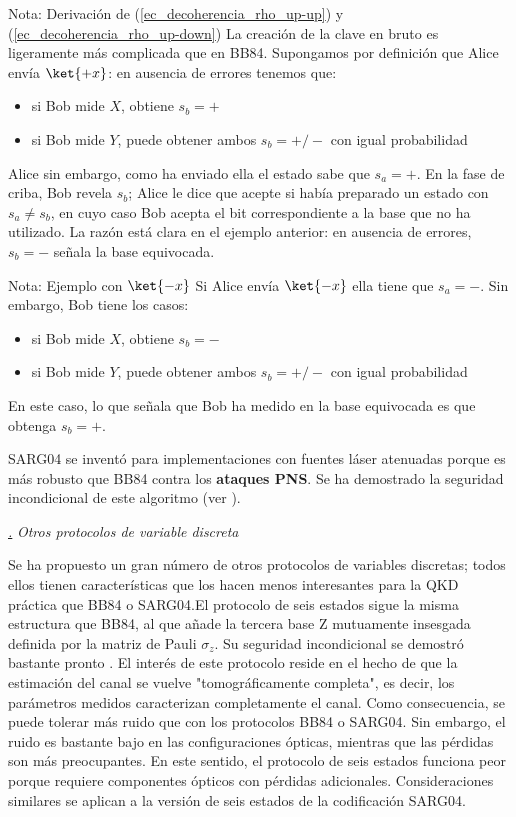 \documentclass[a4paper,11pt]{book} %
\numberwithin{equation}{chapter}
\def\subsubiContadorIt{\par\addtocounter{subsubsection}{1}\underline{\it\thesubsubsection.}\hskip0.5cm \setcounter{subsubsubsectionIt}{0}}
\newcommand{\SubsubiIt}[1]{
		\subsubiContadorIt \textit{#1}
	}
\newcounter{subsubsubsectionIt}[subsubsection]
\begin{document}
\begin{mybox_blue}{Nota: Derivación de (\ref{ec_decoherencia_rho_up-up}) y  (\ref{ec_decoherencia_rho_up-down})}
La creación de la clave en bruto es ligeramente más complicada que en BB84. Supongamos por definición que Alice envía $\ket{+x}$: en ausencia de errores tenemos que:
\begin{itemize}
	\item si Bob mide $X$, obtiene $s_b = +$
	\item si Bob mide $Y$, puede obtener ambos $s_b= +/-$ con igual probabilidad
\end{itemize}  
Alice sin embargo, como ha enviado ella el estado sabe que $s_a = +$. En la fase de criba, Bob revela $s_b$; Alice le dice que acepte si había preparado un estado con $s_a \neq s_b$, en cuyo caso Bob acepta el bit correspondiente a la base que no ha utilizado. La razón está clara en el ejemplo anterior: en ausencia de errores, $s_b= -$ señala la base equivocada.

	\begin{mybox_blue}{Nota: Ejemplo con $\ket{-x}$}
	Si Alice envía $\ket{-x}$ ella tiene que $s_a = -$. Sin embargo, Bob tiene los casos:
	\begin{itemize}
		\item si Bob mide $X$, obtiene $s_b = -$
		\item si Bob mide $Y$, puede obtener ambos $s_b= +/-$ con igual probabilidad
	\end{itemize} 
	En este caso, lo que señala que Bob ha medido en la base equivocada es que obtenga $s_b = +$.
	\end{mybox_blue}

SARG04 se inventó para implementaciones con fuentes láser atenuadas porque es más robusto que BB84 contra los \textbf{ataques PNS}. Se ha demostrado la seguridad incondicional de este algoritmo (ver \cite{QKD_resumen}).


			\SubsubiIt{Otros protocolos de variable discreta}

Se ha propuesto un gran número de otros protocolos de variables discretas; todos ellos tienen características que los hacen menos interesantes para la QKD práctica que BB84 o SARG04.El protocolo de seis estados \cite{QKD_Six_state_2,QKD_Six_state_3} sigue la misma estructura que BB84, al que añade la tercera base Z mutuamente insesgada definida por la matriz de Pauli $\sigma_z$. Su seguridad incondicional se demostró bastante pronto \cite{QKD_Six_state_lo2001proof}. El interés de este protocolo reside en el hecho de que la estimación del canal se vuelve "tomográficamente completa", es decir, los parámetros medidos caracterizan completamente el canal. Como consecuencia, se puede tolerar más ruido que con los protocolos BB84 o SARG04. Sin embargo, el ruido es bastante bajo en las configuraciones ópticas, mientras que las pérdidas son más preocupantes. En este sentido, el protocolo de seis estados funciona peor porque requiere componentes ópticos con pérdidas adicionales. Consideraciones similares se aplican a la versión de seis estados de la codificación SARG04.


\end{mybox_blue}
\end{document}
